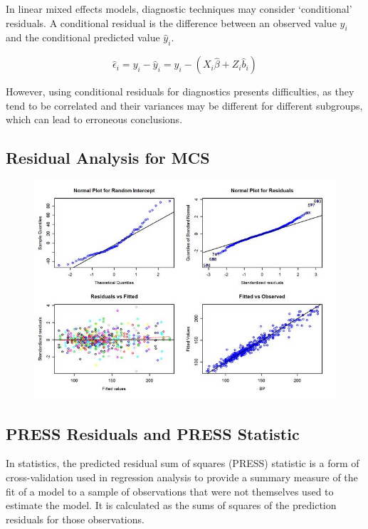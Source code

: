 



In linear mixed effects models, diagnostic techniques may consider `conditional' residuals. A conditional residual is the difference between an observed value $y_{i}$ and the conditional predicted value $\hat{y}_{i} $.

\[ \hat{\epsilon}_{i} = y_{i} - \hat{y}_{i} = y_{i} - ( X_{i}\hat{\beta} + Z_{i}\hat{b}_{i}) \]

However, using conditional residuals for diagnostics presents difficulties, as they tend to be correlated and their variances may be different for different subgroups, which can lead to erroneous conclusions.


\newpage
\subsection{Residual Analysis for MCS}

\begin{figure}[h!]
	\centering
	\includegraphics[width=0.9\linewidth]{images/ResidPlot}
	\caption{}
	\label{fig:ResidPlot}
\end{figure}


\subsection{PRESS Residuals and PRESS Statistic}
In statistics, the predicted residual sum of squares (PRESS) statistic is a form of cross-validation used in regression analysis to provide a summary measure of the fit of a model to a sample of observations that were not themselves used to estimate the model. It is calculated as the sums of squares of the prediction residuals for those observations.

